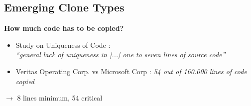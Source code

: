 \subsection{Emerging Clone Types}
	\begin{frame}{\insertsubsection}
\textbf{How much code has to be copied?}
\begin{itemize}
	\item Study on Uniqueness of Code \cite{2010-gabel-su-source-code-uniqueness}:\\
	\textit{\enquote{general lack of uniqueness in [...] one to seven lines of source code}}
	\item Veritas Operating Corp. vs Microsoft Corp \cite{mertzel2008copying}:
	\textit{54 out of 160.000 lines of code copied}
\end{itemize}
\begin{center}
	$\rightarrow$ 8 lines minimum, 54 critical
\end{center}
\end{frame}